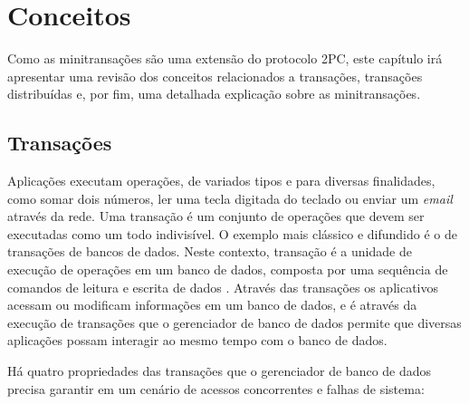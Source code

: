 \documentclass[11pt,twoside,a4paper]{book}
\begin{document}
\chapter{Conceitos}
\label{chap:conceitos}
Como as minitransações são uma extensão do protocolo 2PC, este capítulo irá apresentar uma revisão dos conceitos relacionados a transações, transações distribuídas e, por fim, uma detalhada explicação sobre as minitransações.

\section{Transações}
\label{sec:transacoes}
Aplicações executam operações, de variados tipos e para diversas finalidades, como somar dois números, ler uma tecla digitada do teclado ou enviar um \emph{email} através da rede. Uma transação é um conjunto de operações que devem ser executadas como um todo indivisível. O exemplo mais clássico e difundido é o de transações de bancos de dados. Neste contexto, transação é a unidade de execução de operações em um banco de dados, composta por uma sequência de comandos de leitura e escrita de dados \cite{garcia-molina, vaca}. Através das transações os aplicativos acessam ou modificam informações em um banco de dados, e é através da execução de transações que o gerenciador de banco de dados permite que diversas aplicações possam interagir ao mesmo tempo com o banco de dados.

Há quatro propriedades das transações que o gerenciador de banco de dados precisa garantir em um cenário de acessos concorrentes e falhas de sistema:
\end{document}
